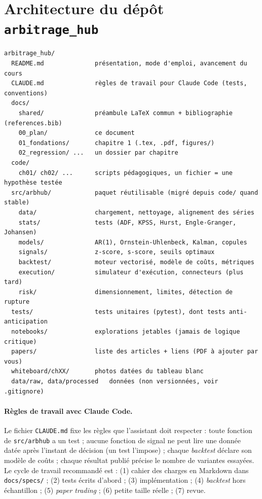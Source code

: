 \documentclass[11pt,a4paper]{article}
\begin{document}
\section{Architecture du dépôt \texttt{arbitrage\_hub}}

{\footnotesize\begin{verbatim}
arbitrage_hub/
  README.md              présentation, mode d'emploi, avancement du cours
  CLAUDE.md              règles de travail pour Claude Code (tests, conventions)
  docs/
    shared/              préambule LaTeX commun + bibliographie (references.bib)
    00_plan/             ce document
    01_fondations/       chapitre 1 (.tex, .pdf, figures/)
    02_regression/ ...   un dossier par chapitre
  code/
    ch01/ ch02/ ...      scripts pédagogiques, un fichier = une hypothèse testée
  src/arbhub/            paquet réutilisable (migré depuis code/ quand stable)
    data/                chargement, nettoyage, alignement des séries
    stats/               tests (ADF, KPSS, Hurst, Engle-Granger, Johansen)
    models/              AR(1), Ornstein-Uhlenbeck, Kalman, copules
    signals/             z-score, s-score, seuils optimaux
    backtest/            moteur vectorisé, modèle de coûts, métriques
    execution/           simulateur d'exécution, connecteurs (plus tard)
    risk/                dimensionnement, limites, détection de rupture
  tests/                 tests unitaires (pytest), dont tests anti-anticipation
  notebooks/             explorations jetables (jamais de logique critique)
  papers/                liste des articles + liens (PDF à ajouter par vous)
  whiteboard/chXX/       photos datées du tableau blanc
  data/raw, data/processed   données (non versionnées, voir .gitignore)
\end{verbatim}}

\paragraph{Règles de travail avec Claude Code.} Le fichier \texttt{CLAUDE.md} fixe les règles que l'assistant doit respecter : toute fonction de \texttt{src/arbhub} a un test ; aucune fonction de signal ne peut lire une donnée datée après l'instant de décision (un test l'impose) ; chaque \emph{backtest} déclare son modèle de coûts ; chaque résultat publié précise le nombre de variantes essayées. Le cycle de travail recommandé est : (1) cahier des charges en Markdown dans \texttt{docs/specs/} ; (2) tests écrits d'abord ; (3) implémentation ; (4) \emph{backtest} hors échantillon ; (5) \emph{paper trading} ; (6) petite taille réelle ; (7) revue.
\end{document}
